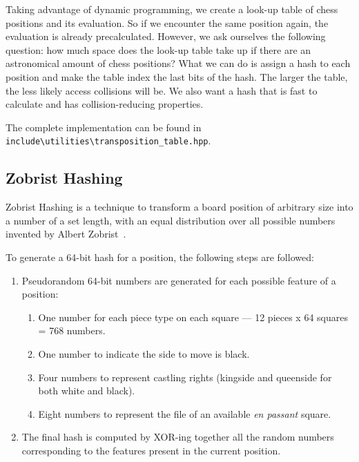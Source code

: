 \noindent Taking advantage of dynamic programming, we create a look-up table of chess positions and its evaluation. So if we encounter the same position again, the evaluation is already precalculated. However, we ask ourselves the following question: how much space does the look-up table take up if there are an astronomical amount of chess positions? What we can do is assign a hash to each position and make the table index the last bits of the hash. The larger the table, the less likely access collisions will be. We also want a hash that is fast to calculate and has collision-reducing properties.
~\cite{TranspositionTable}

\vspace{1em}

\noindent \parbox{\textwidth}{The complete implementation can be found in\\\texttt{include\textbackslash{}utilities\textbackslash{}transposition\_table.hpp}.}

\subsection{Zobrist Hashing}

Zobrist Hashing is a technique to transform a board position of arbitrary size into a number of a set length, with an equal distribution over all possible numbers invented by Albert Zobrist~\cite{ZobristHashing}.

\vspace{1em}

\noindent To generate a 64-bit hash for a position, the following steps are followed:

\begin{enumerate}
  \item Pseudorandom 64-bit numbers are generated for each possible feature of a position:
  \begin{enumerate}
    \item One number for each piece type on each square — 12 pieces x 64 squares = 768 numbers.
    \item One number to indicate the side to move is black.
    \item Four numbers to represent castling rights (kingside and queenside for both white and black).
    \item Eight numbers to represent the file of an available \textit{en passant} square.
  \end{enumerate}
  \item The final hash is computed by XOR-ing together all the random numbers corresponding to the features present in the current position.
\end{enumerate}


